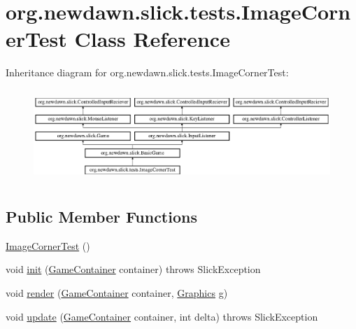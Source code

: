 \hypertarget{classorg_1_1newdawn_1_1slick_1_1tests_1_1_image_corner_test}{}\section{org.\+newdawn.\+slick.\+tests.\+Image\+Corner\+Test Class Reference}
\label{classorg_1_1newdawn_1_1slick_1_1tests_1_1_image_corner_test}
Inheritance diagram for org.\+newdawn.\+slick.\+tests.\+Image\+Corner\+Test\+:\begin{figure}[H]
\begin{center}
\leavevmode
\includegraphics[height=3.522012cm]{classorg_1_1newdawn_1_1slick_1_1tests_1_1_image_corner_test}
\end{center}
\end{figure}
\subsection*{Public Member Functions}
\begin{DoxyCompactItemize}
\item 
\mbox{\hyperlink{classorg_1_1newdawn_1_1slick_1_1tests_1_1_image_corner_test_ade0380ea229639b40e852dd729408be7}{Image\+Corner\+Test}} ()
\item 
void \mbox{\hyperlink{classorg_1_1newdawn_1_1slick_1_1tests_1_1_image_corner_test_ada813543c521f67360f6e89f8c63ca72}{init}} (\mbox{\hyperlink{classorg_1_1newdawn_1_1slick_1_1_game_container}{Game\+Container}} container)  throws Slick\+Exception 
\item 
void \mbox{\hyperlink{classorg_1_1newdawn_1_1slick_1_1tests_1_1_image_corner_test_ad1386a068201a52f4052d68dbd411689}{render}} (\mbox{\hyperlink{classorg_1_1newdawn_1_1slick_1_1_game_container}{Game\+Container}} container, \mbox{\hyperlink{classorg_1_1newdawn_1_1slick_1_1_graphics}{Graphics}} g)
\item 
void \mbox{\hyperlink{classorg_1_1newdawn_1_1slick_1_1tests_1_1_image_corner_test_afe344e0649c5eb63c746e9028ed4aa85}{update}} (\mbox{\hyperlink{classorg_1_1newdawn_1_1slick_1_1_game_container}{Game\+Container}} container, int delta)  throws Slick\+Exception 
\end{DoxyCompactItemize}
